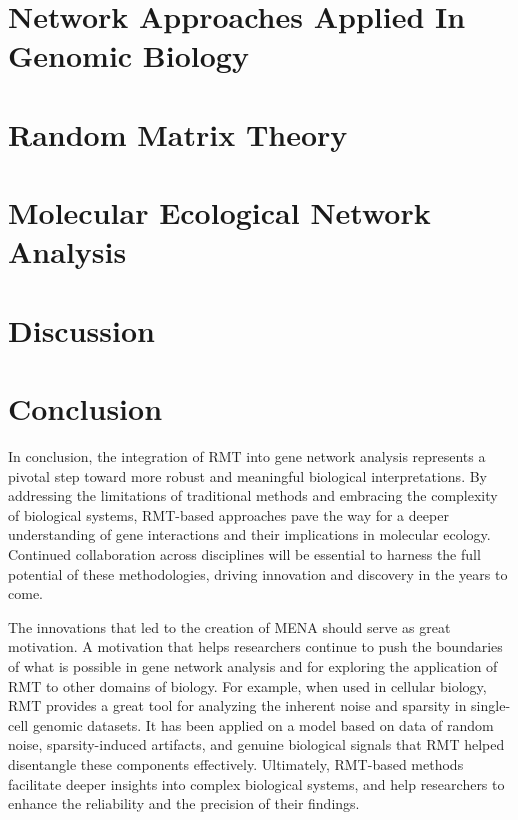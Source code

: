 \documentclass[leqno]{article}[12pt]
\begin{document}
\section{Network Approaches Applied In Genomic Biology}\label{sec:network-approaches-applied-in-genomic-biology}


\section{Random Matrix Theory}\label{sec:random-matrix-theory}


\section{Molecular Ecological Network Analysis}\label{sec:molecular-ecological-network-analysis}


\section{Discussion}\label{sec:discussion}


\section{Conclusion}\label{sec:conclusion}
In conclusion, the integration of RMT into gene network analysis represents a pivotal step toward more robust and meaningful biological interpretations.
By addressing the limitations of traditional methods and embracing the complexity of biological systems, RMT-based approaches pave the way for a deeper understanding of gene interactions and their implications in molecular ecology.
Continued collaboration across disciplines will be essential to harness the full potential of these methodologies, driving innovation and discovery in the years to come.

\noindent The innovations that led to the creation of MENA should serve as great motivation.
A motivation that helps researchers continue to push the boundaries of what is possible in gene network analysis and for exploring the application of RMT to other domains of biology.
For example, when used in cellular biology, RMT provides a great tool for analyzing the inherent noise and sparsity in single-cell genomic datasets.
It has been applied on a model based on data of random noise, sparsity-induced artifacts, and genuine biological signals that RMT helped disentangle these components effectively.
Ultimately, RMT-based methods facilitate deeper insights into complex biological systems, and help researchers to enhance the reliability and the precision of their findings.
\end{document}
